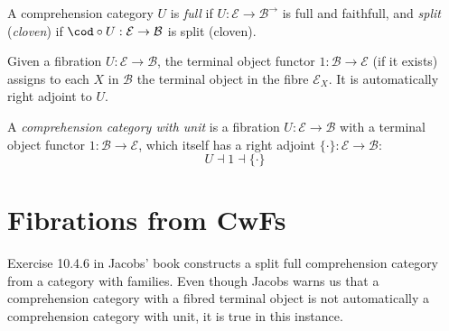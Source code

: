 \documentclass{article}
\begin{document}
A comprehension category $U$ is \emph{full} if $U : \mathcal{E} \to
\mathcal{B}^{\rightarrow}$ is full and faithfull, and \emph{split}
(\emph{cloven}) if $\cod \circ U : \mathcal{E} \to \mathcal{B}$ is
split (cloven).

Given a fibration $U : \mathcal{E} \to \mathcal{B}$, the terminal
object functor $1 : \mathcal{B} \to \mathcal{E}$ (if it exists)
assigns to each $X$ in $\mathcal{B}$ the terminal object in the fibre
$\mathcal{E}_X$. It is automatically right adjoint to $U$.

\begin{definition}
  A \emph{comprehension category with unit} is a fibration $U :
  \mathcal{E} \to \mathcal{B}$ with a terminal object functor $1 :
  \mathcal{B} \to \mathcal{E}$, which itself has a right adjoint
  $\{\cdot\} : \mathcal{E} \to \mathcal{B}$:
\[
U \dashv 1 \dashv \{\cdot\}
\]
\end{definition}

\section{Fibrations from CwFs}

Exercise 10.4.6 in Jacobs' book \cite{jacobs1999catlogTT} constructs a
split full comprehension category from a category with families. Even
though Jacobs \cite[p.\ 618]{jacobs1999catlogTT} warns us that a
comprehension category with a fibred terminal object is not
automatically a comprehension category with unit, it is true in this
instance.
\end{document}
